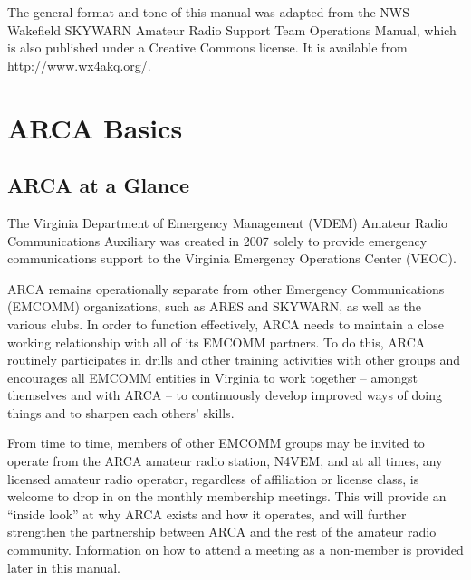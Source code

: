 \documentclass[pdflatex,letterpaper,twoside,12pt]{book}
\begin{document}
The general format and tone of this manual was adapted from the NWS Wakefield SKYWARN Amateur Radio Support Team Operations Manual, which is also published under a Creative Commons license.  It is available from http://www.wx4akq.org/.


\chapter{ARCA Basics}

\section{ARCA at a Glance}

The Virginia Department of Emergency Management (VDEM) Amateur Radio Communications Auxiliary was created in 2007 solely to provide emergency communications support to the Virginia Emergency Operations Center (VEOC).

ARCA remains operationally separate from other Emergency Communications (EMCOMM) organizations, such as ARES and SKYWARN, as well as the various clubs.  In order to function effectively, ARCA needs to maintain a close working relationship with all of its EMCOMM partners.  To do this, ARCA routinely participates in drills and other training activities with other groups and encourages all EMCOMM entities in Virginia to work together – amongst themselves and with ARCA – to continuously develop improved ways of doing things and to sharpen each others' skills.

From time to time, members of other EMCOMM groups may be invited to operate from the ARCA amateur radio station, N4VEM, and at all times, any licensed amateur radio operator, regardless of affiliation or license class, is welcome to drop in on the monthly membership meetings.  This will provide an ``inside look'' at why ARCA exists and how it operates, and will further strengthen the partnership between ARCA and the rest of the amateur radio community.  Information on how to attend a meeting as a non-member is provided later in this manual.
\end{document}
